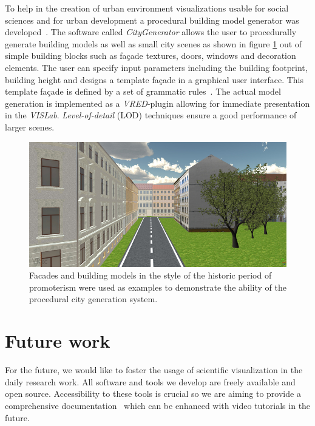 \documentclass[twocolumn]{svjour3}          %
\begin{document}
To help in the creation of urban environment visualizations usable for social sciences and for urban development a procedural\cite{procedural:modelling} building model generator was developed~\cite{bilke:master}. The software called \emph{CityGenerator} allows the user to procedurally generate building models as well as small city scenes as shown in figure \ref{fig:city} out of simple building blocks such as fa\c{c}ade textures, doors, windows and decoration elements. The user can specify input parameters including the building footprint, building height and designs a template fa\c{c}ade in a graphical user interface. This template fa\c{c}ade is defined by a set of grammatic rules~\cite{procedural:buildings}. The actual model generation is implemented as a \emph{VRED}-plugin allowing for immediate presentation in the \emph{VISLab}. \emph{Level-of-detail} (LOD) techniques ensure a good performance of larger scenes.

\begin{figure}[htb]
  \includegraphics[width=\linewidth]{images/city.jpg}
\caption{Facades and building models in the style of the historic period of promoterism were used as examples to demonstrate the ability of the procedural city generation system.}
\label{fig:city}
\end{figure}

\section{Future work}
\label{future-work}

For the future, we would like to foster the usage of scientific visualization in the daily research work. All software and tools we develop are freely available and open source. Accessibility to these tools is crucial so we are aiming to provide a comprehensive documentation~\cite{web:ogs-docs} which can be enhanced with video tutorials in the future.
\end{document}
